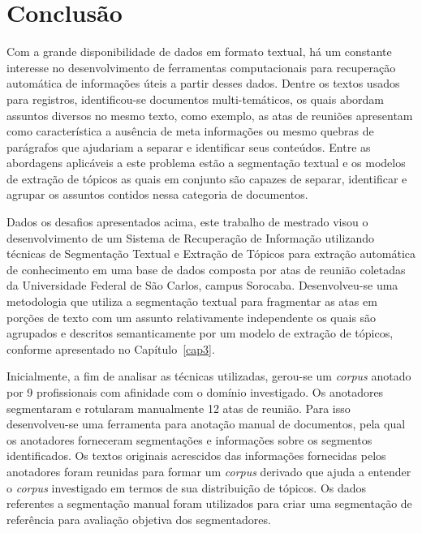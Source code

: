 \chapter{Conclusão}
\label{cap:conclusao}





Com a grande disponibilidade de dados em formato textual, há um constante interesse no desenvolvimento de ferramentas computacionais para recuperação automática de informações úteis a partir desses dados. 
Dentre os textos usados para registros, identificou-se documentos multi-temáticos, os quais abordam assuntos diversos no mesmo texto, como exemplo, as atas de reuniões apresentam como característica a ausência de meta informações ou mesmo quebras de parágrafos que ajudariam a separar e identificar seus conteúdos. 
Entre as abordagens aplicáveis a este problema estão a segmentação textual e os modelos de extração de tópicos as quais em conjunto são capazes de separar, identificar e agrupar os assuntos contidos nessa categoria de documentos.







Dados os desafios apresentados acima, este trabalho de mestrado visou o desenvolvimento de um Sistema de Recuperação de Informação utilizando técnicas de Segmentação Textual e Extração de Tópicos para extração automática de conhecimento em uma base de dados composta por atas de reunião coletadas da Universidade Federal de São Carlos, campus Sorocaba. 
Desenvolveu-se uma metodologia que utiliza a segmentação textual para fragmentar as atas em porções de texto com um assunto relativamente independente os quais são agrupados e descritos semanticamente por um modelo de extração de tópicos, conforme apresentado no Capítulo~\ref{cap3}.

Inicialmente, a fim de analisar as técnicas utilizadas, gerou-se um \textit{corpus} anotado por 9 profissionais com afinidade com o domínio investigado. Os anotadores segmentaram e rotularam manualmente 12 atas de reunião. 
Para isso desenvolveu-se uma ferramenta para anotação manual de documentos, pela qual os anotadores forneceram segmentações e informações sobre os segmentos identificados.
Os textos originais acrescidos das informações fornecidas pelos anotadores foram reunidas para formar um \textit{corpus} derivado que ajuda a entender o \textit{corpus} investigado em termos de sua distribuição de tópicos. Os dados referentes a segmentação manual foram utilizados para criar uma segmentação de referência para avaliação objetiva dos segmentadores. 

